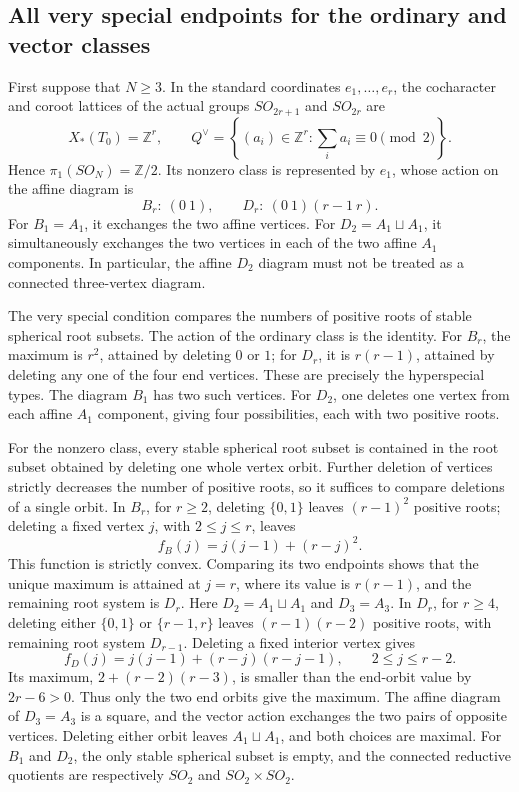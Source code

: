\documentclass[11pt,a4paper]{article}
\theoremstyle{definition}
\theoremstyle{remark}
\begin{document}
\subsection{All very special endpoints for the ordinary and vector classes}
\label{subsec:so-endpoints}

First suppose that \(N\geq3\). In the standard coordinates
\(e_1,\ldots,e_r\), the cocharacter and coroot lattices of the actual groups
\(SO_{2r+1}\) and \(SO_{2r}\) are
\[
 X_*(T_0)=\mathbb Z^r,\qquad
 Q^\vee=\left\{(a_i)\in\mathbb Z^r:
                       \sum_i a_i\equiv0\pmod2\right\}.
\]
Hence \(\pi_1(SO_N)=\mathbb Z/2\). Its nonzero class is represented by
\(e_1\), whose action on the affine diagram is
\[
 B_r:\ (0\ 1),\qquad
 D_r:\ (0\ 1)(r-1\ r).
\]
For \(B_1=A_1\), it exchanges the two affine vertices. For
\(D_2=A_1\sqcup A_1\), it simultaneously exchanges the two vertices in
each of the two affine \(A_1\) components. In particular, the affine
\(D_2\) diagram must not be treated as a connected three-vertex diagram.

The very special condition compares the numbers of positive roots of
stable spherical root subsets. The action of the ordinary class is the
identity. For \(B_r\), the maximum is \(r^2\), attained by deleting
\(0\) or \(1\); for \(D_r\), it is \(r(r-1)\), attained by deleting any
one of the four end vertices. These are precisely the hyperspecial
types. The diagram \(B_1\) has two such vertices. For \(D_2\), one
deletes one vertex from each affine \(A_1\) component, giving four
possibilities, each with two positive roots.

For the nonzero class, every stable spherical root subset is contained
in the root subset obtained by deleting one whole vertex orbit. Further
deletion of vertices strictly decreases the number of positive roots,
so it suffices to compare deletions of a single orbit. In \(B_r\), for
\(r\geq2\), deleting \(\{0,1\}\) leaves \((r-1)^2\) positive roots;
deleting a fixed vertex \(j\), with \(2\leq j\leq r\), leaves
\[
 f_B(j)=j(j-1)+(r-j)^2.
\]
This function is strictly convex. Comparing its two endpoints shows
that the unique maximum is attained at \(j=r\), where its value is
\(r(r-1)\), and the remaining root system is \(D_r\). Here
\(D_2=A_1\sqcup A_1\) and \(D_3=A_3\). In \(D_r\), for \(r\geq4\),
deleting either \(\{0,1\}\) or \(\{r-1,r\}\) leaves
\((r-1)(r-2)\) positive roots, with remaining root system \(D_{r-1}\).
Deleting a fixed interior vertex gives
\[
 f_D(j)=j(j-1)+(r-j)(r-j-1),
                  \qquad 2\leq j\leq r-2.
\]
Its maximum, \(2+(r-2)(r-3)\), is smaller than the end-orbit value by
\(2r-6>0\). Thus only the two end orbits give the maximum. The affine
diagram of \(D_3=A_3\) is a square, and the vector action exchanges the
two pairs of opposite vertices. Deleting either orbit leaves
\(A_1\sqcup A_1\), and both choices are maximal. For \(B_1\) and \(D_2\),
the only stable spherical subset is empty, and the connected reductive
quotients are respectively \(SO_2\) and \(SO_2\times SO_2\).
\end{document}
